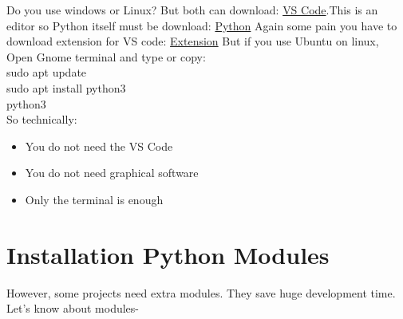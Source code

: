 \documentclass{book}
\begin{document}
Do you use windows or Linux? But both can download: \href{https://code.visualstudio.com/}{VS Code}.This is an editor so Python itself must be download: \href{https://www.python.org/downloads/}{Python}
Again some pain you have to download extension for VS code: \href{https://marketplace.visualstudio.com/items?itemName=ms-python.python&utm_source}{Extension}
But if you use Ubuntu on linux, Open Gnome terminal and type or copy: \\
sudo apt update\\
sudo apt install python3\\
python3\\
So technically:
\begin{itemize}
    \item You do not need the VS Code
    \item You do not need graphical software
    \item Only the terminal is enough
\end{itemize}
\section*{Installation Python Modules}
However, some projects need extra modules. They save huge development time.\\
Let's know about modules-
\end{document}
